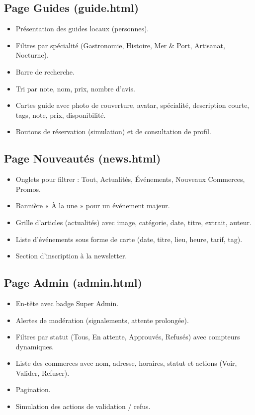 \documentclass[a4paper,12pt]{article}
\begin{document}
\subsection{Page Guides (guide.html)}
\begin{itemize}
    \item Présentation des guides locaux (personnes).
    \item Filtres par spécialité (Gastronomie, Histoire, Mer \& Port, Artisanat, Nocturne).
    \item Barre de recherche.
    \item Tri par note, nom, prix, nombre d’avis.
    \item Cartes guide avec photo de couverture, avatar, spécialité, description courte, tags, note, prix, disponibilité.
    \item Boutons de réservation (simulation) et de consultation de profil.
\end{itemize}

\subsection{Page Nouveautés (news.html)}
\begin{itemize}
    \item Onglets pour filtrer : Tout, Actualités, Événements, Nouveaux Commerces, Promos.
    \item Bannière « À la une » pour un événement majeur.
    \item Grille d’articles (actualités) avec image, catégorie, date, titre, extrait, auteur.
    \item Liste d’événements sous forme de carte (date, titre, lieu, heure, tarif, tag).
    \item Section d’inscription à la newsletter.
\end{itemize}

\subsection{Page Admin (admin.html)}
\begin{itemize}
    \item En‑tête avec badge Super Admin.
    \item Alertes de modération (signalements, attente prolongée).
    \item Filtres par statut (Tous, En attente, Approuvés, Refusés) avec compteurs dynamiques.
    \item Liste des commerces avec nom, adresse, horaires, statut et actions (Voir, Valider, Refuser).
    \item Pagination.
    \item Simulation des actions de validation / refus.
\end{itemize}
\end{document}
